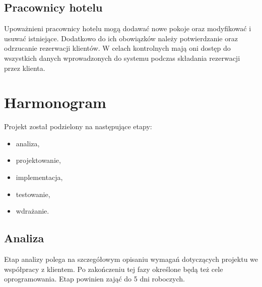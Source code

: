 \documentclass [11pt, a4paper, leqno] {article}
\begin{document}
\subsection{Pracownicy hotelu}
\noindent
Upoważnieni pracownicy hotelu mogą dodawać nowe pokoje oraz modyfikować i usuwać istniejące. Dodatkowo do ich obowiązków należy potwierdzanie oraz odrzucanie rezerwacji klientów. W celach kontrolnych mają oni dostęp do wszystkich danych wprowadzonych do systemu podczas składania rezerwacji przez klienta.



\section{Harmonogram}
\noindent
Projekt został podzielony na następujące etapy:
\begin{itemize}
\item analiza,
\item projektowanie,
\item implementacja,
\item testowanie,
\item wdrażanie.
\end{itemize}

\subsection{Analiza}
\noindent
Etap analizy polega na szczegółowym opisaniu wymagań dotyczących projektu we współpracy z klientem. Po zakończeniu tej fazy określone będą też cele oprogramowania. Etap powinien zająć do 5 dni roboczych.
\end{document}
